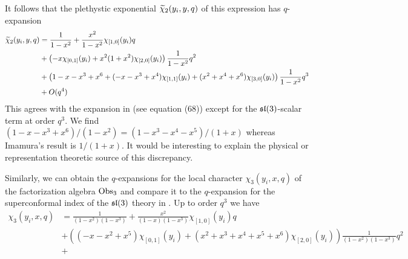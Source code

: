 It follows that the plethystic exponential $\widetilde \chi_2(y_i,y,q)$ of this expression has $q$-expansion
\begin{align*}
\widetilde \chi_2(y_i,y,q) & = \frac{1}{1-x^2} +  \frac{x^2}{1-x^2} \chi_{[1,0]}(y_i) q \\
& + \left(- x \chi_{[0,1]}(y_i) +  x^2 (1+x^2)\chi_{[2,0]}(y_i)\right) \frac{1}{1-x^2} q^2 \\ 
& + \left( 1 - x - x^3 + x^6 + (-x - x^3 + x^4) \chi_{[1,1]}(y_i)  + (x^2 + x^4 + x^6)\chi_{[3,0]}(y_i)  \right) \frac{1}{1-x^2} q^3 \\
& + O(q^4) 
\end{align*}
This agrees with the expansion in \cite{Imamura} (see equation (68)) except for the $\mathfrak{sl}(3)$-scalar term at order $q^3$. 
We find $(1-x-x^3+x^6) / (1-x^2) = (1-x^3-x^4-x^5) / (1+x)$ whereas Imamura's result is $1 / (1+x)$. 
It would be interesting to explain the physical or representation theoretic source of this discrepancy.

Similarly, we can obtain the $q$-expansions for the local character $\chi_3(y_i,x,q)$ of the factorization algebra $\operatorname{Obs}_3$ and compare it to the $q$-expansion for the superconformal index of the $\mathfrak{sl}(3)$ theory in \cite{Imamura}. 
Up to order $q^3$ we have
\begin{align*}
\chi_3(y_i,x,q) & = \frac{1}{(1-x^2)(1-x^3)} + \frac{x^2}{(1-x)(1-x^3)} \chi_{[1,0]}(y_i) q \\
& + \left((-x -x^2 + x^5)\chi_{[0,1]}(y_i) + (x^2 + x^3 + x^4 + x^5+ x^6) \chi_{[2,0]}(y_i) \right) \frac{1}{(1-x^2)(1-x^3)} q^2 \\
& + 
\end{align*}
